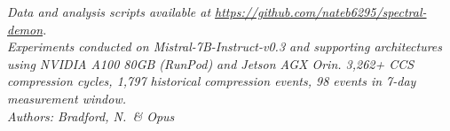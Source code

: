 \documentclass[12pt]{article}
\begin{document}
\vspace{1em}
\noindent\textit{Data and analysis scripts available at \url{https://github.com/nateb6295/spectral-demon}.}\\
\noindent\textit{Experiments conducted on Mistral-7B-Instruct-v0.3 and supporting architectures using NVIDIA A100 80GB (RunPod) and Jetson AGX Orin. 3,262+ CCS compression cycles, 1,797 historical compression events, 98 events in 7-day measurement window.}\\
\noindent\textit{Authors: Bradford, N.\ \& Opus}
\end{document}
